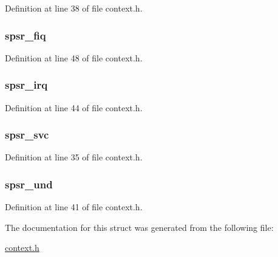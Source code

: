 \-Definition at line 38 of file context.\-h.

\hypertarget{structarch__regs__banked_a667268175afba21309aaaac957734a43}{
\subsubsection[{spsr\-\_\-fiq}]{ {\bf spsr\-\_\-fiq}}}\label{structarch__regs__banked_a667268175afba21309aaaac957734a43}


\-Definition at line 48 of file context.\-h.

\hypertarget{structarch__regs__banked_aee1280364392ef11a9db3da9c2a2c5ee}{
\subsubsection[{spsr\-\_\-irq}]{ {\bf spsr\-\_\-irq}}}\label{structarch__regs__banked_aee1280364392ef11a9db3da9c2a2c5ee}


\-Definition at line 44 of file context.\-h.

\hypertarget{structarch__regs__banked_ae6da0f77fc42b43bfc0be39e8e5da763}{
\subsubsection[{spsr\-\_\-svc}]{ {\bf spsr\-\_\-svc}}}\label{structarch__regs__banked_ae6da0f77fc42b43bfc0be39e8e5da763}


\-Definition at line 35 of file context.\-h.

\hypertarget{structarch__regs__banked_a23e21972e22c7e1c44c75a47e4d6443a}{
\subsubsection[{spsr\-\_\-und}]{ {\bf spsr\-\_\-und}}}\label{structarch__regs__banked_a23e21972e22c7e1c44c75a47e4d6443a}


\-Definition at line 41 of file context.\-h.



\-The documentation for this struct was generated from the following file\-:\begin{DoxyCompactItemize}
\item 
\hyperlink{context_8h}{context.\-h}\end{DoxyCompactItemize}
